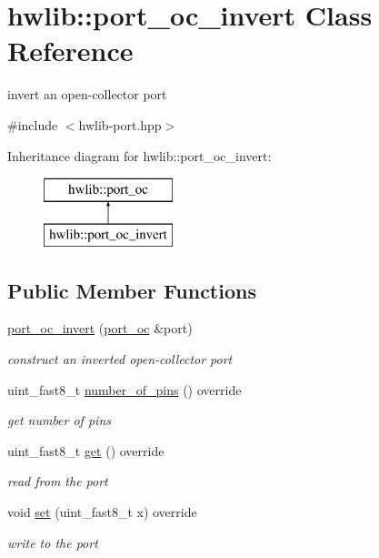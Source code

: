 \hypertarget{classhwlib_1_1port__oc__invert}{}\section{hwlib\+:\+:port\+\_\+oc\+\_\+invert Class Reference}
\label{classhwlib_1_1port__oc__invert}


invert an open-\/collector port  




{\ttfamily \#include $<$hwlib-\/port.\+hpp$>$}

Inheritance diagram for hwlib\+:\+:port\+\_\+oc\+\_\+invert\+:\begin{figure}[H]
\begin{center}
\leavevmode
\includegraphics[height=2.000000cm]{classhwlib_1_1port__oc__invert}
\end{center}
\end{figure}
\subsection*{Public Member Functions}
\begin{DoxyCompactItemize}
\item 
\hyperlink{classhwlib_1_1port__oc__invert_ac475bce6da1c77573122a4bc23ee7997}{port\+\_\+oc\+\_\+invert} (\hyperlink{classhwlib_1_1port__oc}{port\+\_\+oc} \&port)
\begin{DoxyCompactList}\small\item\em construct an inverted open-\/collector port \end{DoxyCompactList}\item 
uint\+\_\+fast8\+\_\+t \hyperlink{classhwlib_1_1port__oc__invert_a4dc1f8dec0b8a0b443523f29b1f78d65}{number\+\_\+of\+\_\+pins} () override
\begin{DoxyCompactList}\small\item\em get number of pins \end{DoxyCompactList}\item 
uint\+\_\+fast8\+\_\+t \hyperlink{classhwlib_1_1port__oc__invert_ab6d07c63e363949fd852b109b88923f7}{get} () override
\begin{DoxyCompactList}\small\item\em read from the port \end{DoxyCompactList}\item 
void \hyperlink{classhwlib_1_1port__oc__invert_a1a3a108756e4de47025d6a065c91ff18}{set} (uint\+\_\+fast8\+\_\+t x) override
\begin{DoxyCompactList}\small\item\em write to the port \end{DoxyCompactList}\end{DoxyCompactItemize}


